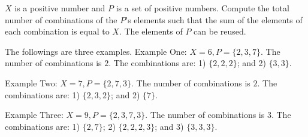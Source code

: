 $X$ is a positive number and $P$ is a set of positive numbers. 
Compute the total number of combinations of the $P$'s elements 
such that the sum of the elements of each combination is equal to $X$. 
The elements of $P$ can be reused.

The followings are three examples.
Example One: $X = 6, P = \{2, 3, 7\}$. 
The number of combinations is $2$. 
The combinations are: 1) $\{2,2,2\}$; and 2) $\{3,3\}$.

Example Two: $X = 7, P = \{2, 7, 3\}$. 
The number of combinations is $2$. 
The combinations are: 1) $\{2,3,2\}$; and 2) $\{7\}$.

Example Three: $X = 9, P = \{2, 3, 7, 3\}$. 
The number of combinations is $3$. 
The combinations are: 1) $\{2, 7\}$; 2) $\{2, 2, 2, 3\}$; and 3) $\{3, 3, 3\}$.
